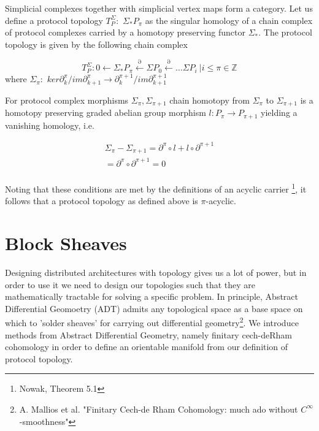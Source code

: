 \documentclass{article}
\begin{document}
Simplicial complexes together with simplicial vertex maps form a category. Let us define a protocol topology $T^{\Sigma}_P: $ $\Sigma_{*}P_\pi$ as the singular homology of a chain complex of protocol complexes carried by a homotopy preserving functor $\Sigma_*$. The protocol topology is given by the following chain complex

\begin{equation} \label{eq1}
T^{\Sigma}_P: 0 \leftarrow \Sigma_{*}P_\pi \xleftarrow{\partial} \Sigma P_{0} \xleftarrow{\partial} \dots \Sigma P_i \ | i \leq \pi \in \mathbb{Z}
\end{equation} \label{eq1}
where $\Sigma_\pi: $ $ker \partial^{\pi}_{k}/im \partial^{\pi}_{k+1} \rightarrow \partial^{\pi+1}_{k} /im \partial^{\pi+1}_{k+1}$ 

For protocol complex morphisms $\Sigma_\pi, \Sigma_{\pi+1}$ chain homotopy from $\Sigma_\pi$ to $\Sigma_{\pi+1}$ is a homotopy preserving graded abelian group morphism $l: P_{\pi} \rightarrow P_{\pi+1}$ yielding a vanishing homology, i.e. 

\begin{equation} \label{eq1}
\begin{split}
\Sigma_\pi - \Sigma_{\pi+1} =  \partial^{\pi}\circ l + l \circ \partial^{\pi+1} \\
= \partial^\pi \circ \partial^{\pi+1} = 0 \\
\end{split}
\end{equation}

Noting that these conditions are met by the definitions of an acyclic carrier \footnote{Nowak, Theorem 5.1}, it follows that a protocol topology as defined above is $\pi$-acyclic.

\section{Block Sheaves}
Designing distributed architectures with topology gives us a lot of power, but in order to use it we need to design our topologies such that they are mathematically tractable for solving a specific problem. In principle, Abstract Differential Geomoetry (ADT) admits any topological space as a base space on which to 'solder sheaves' for carrying out differential geometry\footnote{A. Mallios et al. "Finitary Cech-de Rham Cohomology: much ado without $C^{\infty}$-smoothness"}. We introduce methods from Abstract Differential Geometry, namely finitary cech-deRham cohomology in order to define an orientable manifold from our definition of protocol topology.
\end{document}
